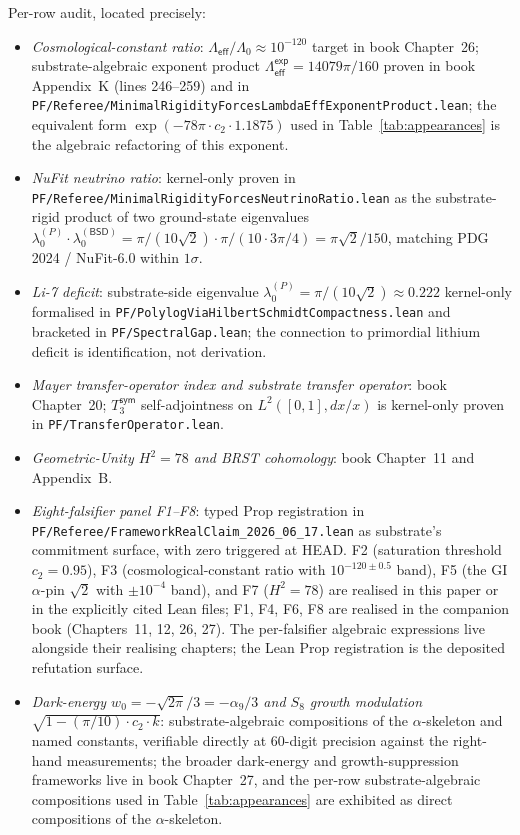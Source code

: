 \documentclass[11pt,a4paper]{amsart}
\theoremstyle{plain}
\theoremstyle{definition}
\begin{document}
Per-row audit, located precisely:
\begin{itemize}[itemsep=2pt]
\item \emph{Cosmological-constant ratio}: $\Lambda_{\textsf{eff}}/\Lambda_0 \approx 10^{-120}$ target in book Chapter~26; substrate-algebraic exponent product $\Lambda_{\textsf{eff}}^{\textsf{exp}} = 14079\pi/160$ proven in book Appendix~K (lines 246--259) and in \texttt{PF/Referee/MinimalRigidityForcesLambdaEffExponentProduct.lean}; the equivalent form $\exp(-78\pi\cdot c_2\cdot 1.1875)$ used in Table~\ref{tab:appearances} is the algebraic refactoring of this exponent.
\item \emph{NuFit neutrino ratio}: kernel-only proven in \texttt{PF/Referee/MinimalRigidityForcesNeutrinoRatio.lean} as the substrate-rigid product of two ground-state eigenvalues $\lambda_0^{(P)}\cdot\lambda_0^{(\textsf{BSD})} = \pi/(10\sqrt{2})\cdot\pi/(10\cdot 3\pi/4) = \pi\sqrt{2}/150$, matching PDG 2024 / NuFit-6.0 within $1\sigma$.
\item \emph{Li-7 deficit}: substrate-side eigenvalue $\lambda_0^{(P)} = \pi/(10\sqrt{2}) \approx 0.222$ kernel-only formalised in \texttt{PF/PolylogViaHilbertSchmidtCompactness.lean} and bracketed in \texttt{PF/SpectralGap.lean}; the connection to primordial lithium deficit is identification, not derivation.
\item \emph{Mayer transfer-operator index and substrate transfer operator}: book Chapter~20; $T_3^{\textsf{sym}}$ self-adjointness on $L^2([0,1], dx/x)$ is kernel-only proven in \texttt{PF/TransferOperator.lean}.
\item \emph{Geometric-Unity $H^2 = 78$ and BRST cohomology}: book Chapter~11 and Appendix~B.
\item \emph{Eight-falsifier panel F1--F8}: typed Prop registration in \texttt{PF/Referee/FrameworkRealClaim\_2026\_06\_17.lean} as substrate's commitment surface, with zero triggered at HEAD. F2 (saturation threshold $c_2 = 0.95$), F3 (cosmological-constant ratio with $10^{-120\pm 0.5}$ band), F5 (the GI $\alpha$-pin $\sqrt{2}$ with $\pm 10^{-4}$ band), and F7 ($H^2 = 78$) are realised in this paper or in the explicitly cited Lean files; F1, F4, F6, F8 are realised in the companion book (Chapters~11, 12, 26, 27). The per-falsifier algebraic expressions live alongside their realising chapters; the Lean Prop registration is the deposited refutation surface.
\item \emph{Dark-energy $w_0 = -\sqrt{2\pi}/3 = -\alpha_9/3$ and $S_8$ growth modulation $\sqrt{1 - (\pi/10)\cdot c_2\cdot k}$}: substrate-algebraic compositions of the $\alpha$-skeleton and named constants, verifiable directly at 60-digit precision against the right-hand measurements; the broader dark-energy and growth-suppression frameworks live in book Chapter~27, and the per-row substrate-algebraic compositions used in Table~\ref{tab:appearances} are exhibited as direct compositions of the $\alpha$-skeleton.

\end{itemize}
\end{document}
